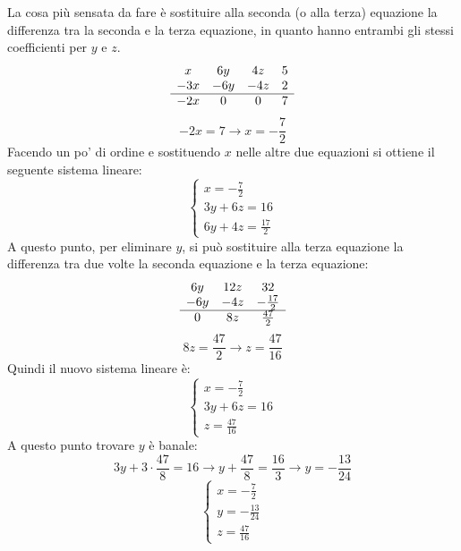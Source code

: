 La cosa più sensata da fare è sostituire alla seconda (o alla terza) equazione la differenza tra la seconda e la terza equazione, in quanto hanno entrambi gli stessi coefficienti per $y$ e $z$.
\[
    \begin{array}{c c c c}
        x & 6y & 4z & 5 \\
        -3x & -6y & -4z & 2 \\
        \hline
        -2x & 0 & 0 & 7
    \end{array}
\]
\[
    -2x = 7 \rightarrow x = -\frac{7}{2}
\]
Facendo un po' di ordine e sostituendo $x$ nelle altre due equazioni si ottiene il seguente sistema lineare:
\[
    \begin{cases}
        x = -\frac{7}{2} \\
        3y + 6z = 16 \\
        6y + 4z = \frac{17}{2}
    \end{cases}
\]
A questo punto, per eliminare $y$, si può sostituire alla terza equazione la differenza tra due volte la seconda equazione e la terza equazione:
\[
    \begin{array}{c c c}
        6y & 12z &32 \\
        -6y & -4z & -\frac{17}{2} \\
        \hline
        0 & 8z & \frac{47}{2}
    \end{array}
\]
\[
    8z = \frac{47}{2} \rightarrow z = \frac{47}{16}
\]
Quindi il nuovo sistema lineare è:
\[
    \begin{cases}
        x = -\frac{7}{2} \\
        3y + 6z = 16 \\
        z = \frac{47}{16}
    \end{cases}
\]
A questo punto trovare $y$ è banale:
\[
    3y + 3 \cdot \frac{47}{8} = 16 \rightarrow y + \frac{47}{8} = \frac{16}{3} \rightarrow y = -\frac{13}{24}
\]
\[
    \begin{cases}
        x = -\frac{7}{2} \\
        y = -\frac{13}{24} \\
        z = \frac{47}{16}
    \end{cases}
\]

